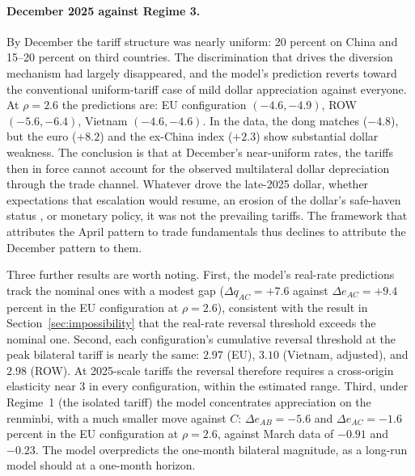 \documentclass[11pt]{article}
\theoremstyle{plain}
\theoremstyle{remark}
\numberwithin{lemma}{section}
\numberwithin{proposition}{section}
\numberwithin{corollary}{section}
\newenvironment{revblock}{\par\begingroup\color{RevBlue}}{\endgroup\par}
\begin{document}
\begin{revblock}
\paragraph{December 2025 against Regime 3.} By December the tariff structure was nearly uniform: 20 percent on China and 15--20 percent on third countries. The discrimination that drives the diversion mechanism had largely disappeared, and the model's prediction reverts toward the conventional uniform-tariff case of mild dollar appreciation against everyone. At $\rho = 2.6$ the predictions are: EU configuration $(-4.6, -4.9)$, ROW $(-5.6, -6.4)$, Vietnam $(-4.6, -4.6)$. In the data, the dong matches ($-4.8$), but the euro ($+8.2$) and the ex-China index ($+2.3$) show substantial dollar weakness. The conclusion is that at December's near-uniform rates, the tariffs then in force cannot account for the observed multilateral dollar depreciation through the trade channel. Whatever drove the late-2025 dollar, whether expectations that escalation would resume, an erosion of the dollar's safe-haven status \citep{kalemli2025, cardani2025exchange}, or monetary policy, it was not the prevailing tariffs. The framework that attributes the April pattern to trade fundamentals thus declines to attribute the December pattern to them.

Three further results are worth noting. First, the model's real-rate predictions track the nominal ones with a modest gap ($\Delta q_{AC} = +7.6$ against $\Delta e_{AC} = +9.4$ percent in the EU configuration at $\rho = 2.6$), consistent with the result in Section~\ref{sec:impossibility} that the real-rate reversal threshold exceeds the nominal one. Second, each configuration's cumulative reversal threshold at the peak bilateral tariff is nearly the same: $2.97$ (EU), $3.10$ (Vietnam, adjusted), and $2.98$ (ROW). At 2025-scale tariffs the reversal therefore requires a cross-origin elasticity near $3$ in every configuration, within the estimated range. Third, under Regime~1 (the isolated tariff) the model concentrates appreciation on the renminbi, with a much smaller move against $C$: $\Delta e_{AB} = -5.6$ and $\Delta e_{AC} = -1.6$ percent in the EU configuration at $\rho = 2.6$, against March data of $-0.91$ and $-0.23$. The model overpredicts the one-month bilateral magnitude, as a long-run model should at a one-month horizon.


\end{revblock}
\end{document}
